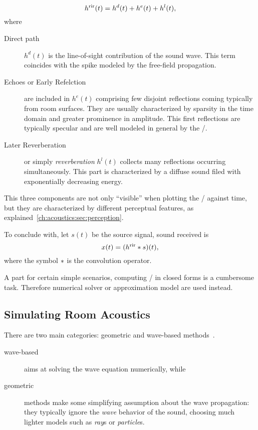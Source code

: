 \begin{equation}\label{eq:acoustics:rir_full}
h^{\text{rir}}(t) = h^d(t) + h^e(t) + h^l(t)
,
\end{equation}
where
\begin{description}
    \item[Direct path] $h^d(t)$ is the line-of-sight contribution of the sound wave.
    This term coincides with the spike modeled by the free-field propagation.
    \item[Echoes or Early Refelction] are included in $h^e(t)$ comprising few disjoint reflections coming typically from room surfaces.
    They are usually characterized by sparsity in the time domain and greater prominence in amplitude.
    This first reflections are typically specular and are well modeled in general by the \ISM/.
    \item[Later Reverberation] or simply \textit{reverberation} $h^l(t)$ collects many reflections occurring simultaneously.
    This part is characterized by a diffuse sound filed with exponentially decreasing energy.
\end{description}
This three components are not only ``visible'' when plotting the \RIR/ against time,
but they are characterized by different perceptual features, as explained~\cref{ch:acoustics:sec:perception}.

To conclude with, let $s(t)$ be the source signal, sound received is
\begin{equation}
    x(t) = (h^{\text{rir}} \ast s)(t)
    ,
\end{equation}
where the symbol $\ast$ is the convolution operator.

A part for certain simple scenarios, computing \RIRs/ in closed forms is a cumbersome task.
Therefore numerical solver or approximation model are used instead.

\subsection{Simulating Room Acoustics}\label{sec:acoustics:simulators}
There are two main categories: geometric and wave-based methods~\cite{habets2006room, savioja2015overview, thomas2017wayverb}.
\begin{description}
    \item[wave-based] aims at solving the wave equation numerically, while
    \item[geometric] methods make some simplifying assumption about the wave propagation:
    they typically ignore the \textit{wave} behavior of the sound, choosing much lighter models such as \textit{ray}s or \textit{particle}s.
\end{description}

